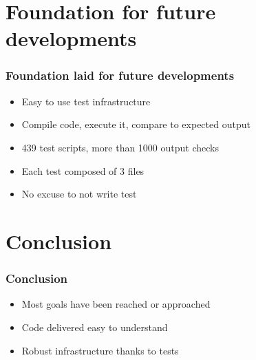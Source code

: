 \documentclass{beamer}
\begin{document}
\section{Foundation for future developments}

\begin{frame}
\frametitle{Foundation laid for future developments}
\begin{itemize}
  \item Easy to use test infrastructure
  \item Compile code, execute it, compare to expected output
  \item 439 test scripts, more than 1000 output checks
  \item Each test composed of 3 files
  \item No excuse to not write test
\end{itemize}
\end{frame}


\section{Conclusion}

\begin{frame}
\frametitle{Conclusion}
\begin{itemize}
  \item Most goals have been reached or approached
  \item Code delivered easy to understand
  \item Robust infrastructure thanks to tests
\end{itemize}
\end{frame}
\end{document}
